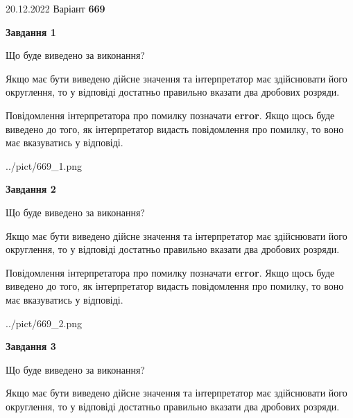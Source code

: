 \documentclass[12pt, ukrainian]{article}
\begin{document}
{20.12.2022 Варіант \No \textbf { 669 }\par}
{
\begin {Large}

{\begin {center}\textbf{Завдання 1}\end {center}}\par
Що буде виведено за виконання? \par

Якщо має бути виведено дійсне значення та інтерпретатор має здійснювати його округлення, 
то у відповіді достатньо правильно вказати два дробових розряди.

Повідомлення інтерпретатора про помилку позначати \textbf{error}.
Якщо щось буде виведено до того, як інтерпретатор видасть повідомлення про помилку, 
то воно має вказуватись у відповіді. \par

\begin{center}
	{../pict/669_1.png}
\end{center}
\newpage

{\begin {center}\textbf{Завдання 2}\end {center}}\par
Що буде виведено за виконання? \par

Якщо має бути виведено дійсне значення та інтерпретатор має здійснювати його округлення, 
то у відповіді достатньо правильно вказати два дробових розряди.

Повідомлення інтерпретатора про помилку позначати \textbf{error}.
Якщо щось буде виведено до того, як інтерпретатор видасть повідомлення про помилку, 
то воно має вказуватись у відповіді. \par

\begin{center}
	{../pict/669_2.png}
\end{center}
\newpage

{\begin {center}\textbf{Завдання 3}\end {center}}\par
Що буде виведено за виконання? \par

Якщо має бути виведено дійсне значення та інтерпретатор має здійснювати його округлення, 
то у відповіді достатньо правильно вказати два дробових розряди.


\end{Large}}
\end{document}
